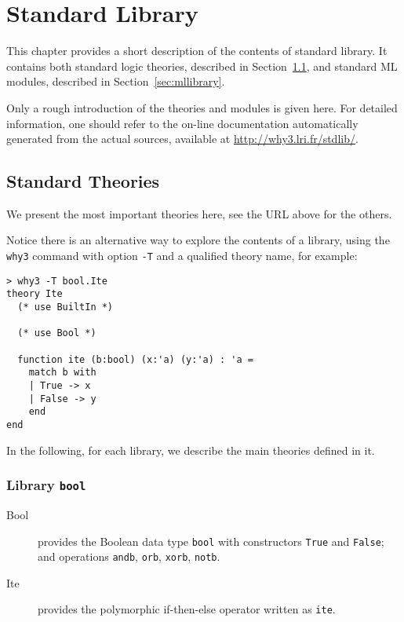 \chapter{Standard Library}
\label{chap:library}

This chapter provides a short description of the contents of \why
standard library. It contains both standard logic theories, described
in Section~\ref{sec:stdlib}, and standard ML modules, described in
Section~\ref{sec:mllibrary}.

Only a rough introduction of the theories and modules is given
here. For detailed information, one should refer to the on-line
documentation automatically generated from the actual sources,
available at \url{http://why3.lri.fr/stdlib/}.


\section{Standard Theories}
\label{sec:stdlib}

We present the most important theories here, see the URL above for the
others.

Notice there is an alternative way to explore the contents of a
library, using the \verb|why3| command with option 
\verb|-T| and a qualified theory name, for example:

\begin{verbatim}
> why3 -T bool.Ite
theory Ite
  (* use BuiltIn *)

  (* use Bool *)

  function ite (b:bool) (x:'a) (y:'a) : 'a =
    match b with
    | True -> x
    | False -> y
    end
end
\end{verbatim}

In the following, for each library, we describe the main theories
defined in it.

\subsection{Library \texttt{bool}}

\begin{description}

\item[Bool] provides the Boolean data type \verb|bool| with
  constructors \verb|True| and \verb|False|; and operations \verb|andb|, \verb|orb|, \verb|xorb|, \verb|notb|.

\item[Ite] provides the polymorphic if-then-else operator written as \verb|ite|.

\end{description}

